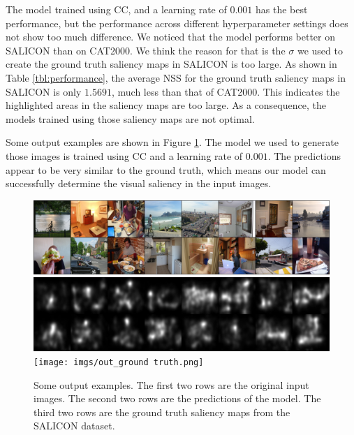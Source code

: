 \documentclass[12pt]{article}
\begin{document}
The model trained using CC, and a learning rate of $0.001$ has the best performance, but the performance
across different hyperparameter settings does not show too much difference. We noticed that
the model performs better on SALICON than on CAT2000. We think the reason for that is the $\sigma$
we used to create the ground truth saliency maps in SALICON is too large. As shown in Table \ref{tbl:performance},
the average NSS for the ground truth saliency maps in SALICON is only $1.5691$, much less than that
of CAT2000. This indicates the highlighted areas in the saliency maps are too large. As a consequence,
the models trained using those saliency maps are not optimal.

Some output examples are shown in Figure \ref{img:output_example}. The model we used to generate those images is trained using CC and a learning rate of $0.001$. The predictions appear to be
very similar to the ground truth, which means our model can successfully determine the visual saliency
in the input images.

\begin{figure}[!h]
    \begin{adjustwidth}{-0.6cm}{}
    \centering
    \includegraphics[width=7in]{imgs/out_original_image.png}
    \includegraphics[width=7in]{imgs/out_prediction.png}
    \texttt{[image: imgs/out\_ground truth.png]}
    \end{adjustwidth}
    \caption{Some output examples. The first two rows are the original input images.
    The second two rows are the predictions of the model. The third two rows are the
    ground truth saliency maps from the SALICON dataset.}
    \label{img:output_example}
\end{figure}
\end{document}
